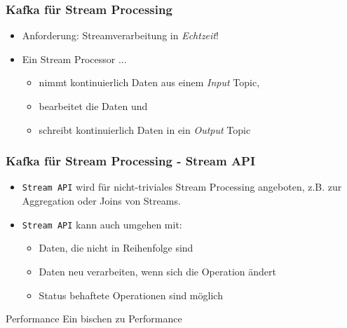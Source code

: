 \begin{frame}
\frametitle{Kafka für Stream Processing}

\begin{itemize}
	\item Anforderung: Streamverarbeitung in \textit{Echtzeit}!
	\item Ein Stream Processor ...
	\begin{itemize}
		\item nimmt kontinuierlich Daten aus einem \textit{Input} Topic,   %
		\item bearbeitet die Daten und %
		\item schreibt kontinuierlich Daten in ein \textit{Output} Topic %
	\end{itemize}
\end{itemize}

\end{frame}


\begin{frame}
\frametitle{Kafka für Stream Processing - Stream API}

\begin{itemize}
	\item \texttt{Stream API} wird für nicht-triviales Stream Processing angeboten,
	z.B. zur Aggregation oder Joins von Streams. 
	\item \texttt{Stream API} kann auch umgehen mit:
	\begin{itemize}
		\item Daten, die nicht in Reihenfolge sind  %
		\item Daten neu verarbeiten, wenn sich die Operation ändert %
		\item Status behaftete Operationen sind möglich %
	\end{itemize}
\end{itemize}

\end{frame}

\begin{frame}{Performance}
	Ein bischen zu Performance
\end{frame}

